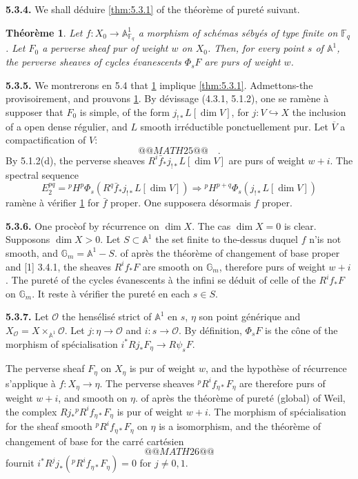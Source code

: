 \documentclass[12pt,a4paper]{article}
\theoremstyle{plain}
\newtheorem{theorem}{Th\'{e}or\`{e}me}[section]
\theoremstyle{definition}
\newcommand{\into}{\hookrightarrow}
\begin{document}
{{\noindent\textbf{5.3.4.} We shall d\'{e}duire \ref{thm:5.3.1} of the th\'{e}or\`{e}me of puret\'{e} suivant.

\begin{theorem}\label{thm:5.3.4}
Let $f: X_{0} \to \mathbb{A}_{\mathbb{F}_{q}}^{1}$ a morphism of sch\'{e}mas s\'{e}by\'{e}s of type finite on $\mathbb{F}_{q}$. Let $F_{0}$ a perverse sheaf pur of weight $w$ on $X_{0}$. Then, for every point $s$ of $\mathbb{A}^{1}$, the perverse sheaves of cycles \'{e}vanescents $\Phi_{s}F$ are purs of weight $w$.
\end{theorem}

\noindent\textbf{5.3.5.} We montrerons en 5.4 that \ref{thm:5.3.4} implique \ref{thm:5.3.1}. Admettons-the provisoirement, and prouvons \ref{thm:5.3.4}. By d\'{e}vissage (4.3.1, 5.1.2), one se ram\`{e}ne \`{a} supposer that $F_{0}$ is simple, of the form $j_{!*}L[\dim V]$, for $j: V \into X$ the inclusion of a open dense r\'{e}gulier, and $L$ smooth irr\'{e}ductible ponctuellement pur. Let $\overline{V}$ a compactification of $V$:
\[
@@MATH25@@
\quad.
\]
By 5.1.2(d), the perverse sheaves $R^{i}\bar{f}_{*}j_{!*}L[\dim V]$ are purs of weight $w+i$. The spectral sequence
\[
E_{2}^{pq} = {}^{p}H^{p}\Phi_{s}(R^{q}\bar{f}_{*}j_{!*}L[\dim V]) \Rightarrow {}^{p}H^{p+q}\Phi_{s}(j_{!*}L[\dim V])
\]
ram\`{e}ne \`{a} v\'{e}rifier \ref{thm:5.3.4} for $\bar{f}$ proper. One supposera d\'{e}sormais $f$ proper.

\noindent\textbf{5.3.6.} One proc\`{e}of by r\'{e}currence on $\dim X$. The cas $\dim X = 0$ is clear. Supposons $\dim X > 0$. Let $S \subset \mathbb{A}^{1}$ the set finite to the-dessus duquel $f$ n'is not smooth, and $\mathbb{G}_{m} = \mathbb{A}^{1} - S$. of apr\`{e}s the th\'{e}or\`{e}me of changement of base proper and [1] 3.4.1, the sheaves $R^{i}f_{*}F$ are smooth on $\mathbb{G}_{m}$, therefore purs of weight $w+i$. The puret\'{e} of the cycles \'{e}vanescents \`{a} the infini se d\'{e}duit of celle of the $R^{i}f_{*}F$ on $\mathbb{G}_{m}$. It reste \`{a} v\'{e}rifier the puret\'{e} en each $s \in S$.

\noindent\textbf{5.3.7.} Let $\mathcal{O}$ the hens\'{e}lis\'{e} strict of $\mathbb{A}^{1}$ en $s$, $\eta$ son point g\'{e}n\'{e}rique and $X_{\mathcal{O}} = X \times_{\mathbb{A}^{1}} \mathcal{O}$. Let $j: \eta \to \mathcal{O}$ and $i: s \to \mathcal{O}$. By d\'{e}finition, $\Phi_{s}F$ is the c\^{o}ne of the morphism of sp\'{e}cialisation $i^{*}Rj_{*}F_{\eta} \to R\psi_{s}F$.

The perverse sheaf $F_{\eta}$ on $X_{\eta}$ is pur of weight $w$, and the hypoth\`{e}se of r\'{e}currence s'applique \`{a} $f: X_{\eta} \to \eta$. The perverse sheaves ${}^{p}R^{i}f_{\eta*}F_{\eta}$ are therefore purs of weight $w+i$, and smooth on $\eta$. of apr\`{e}s the th\'{e}or\`{e}me of puret\'{e} (global) of Weil, the complex $Rj_{*}{}^{p}R^{i}f_{\eta*}F_{\eta}$ is pur of weight $w+i$. The morphism of sp\'{e}cialisation for the sheaf smooth ${}^{p}R^{i}f_{\eta*}F_{\eta}$ on $\eta$ is a isomorphism, and the th\'{e}or\`{e}me of changement of base for the carr\'{e} cart\'{e}sien
\[
@@MATH26@@
\]
fournit $i^{*}R^{j}j_{*}({}^{p}R^{i}f_{\eta*}F_{\eta}) = 0$ for $j \neq 0,1$.

}}
\end{document}
